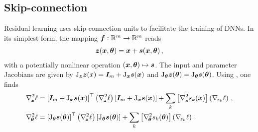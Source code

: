 \subsection{Skip-connection}\label{hbp::subsec:skipconnectionBackwardPass}
Residual learning \cite{he2016deep} uses skip-connection units to
facilitate the training of DNNs. In its simplest form, the
mapping ${\bm{f}}: \mathbb{R}^m \to \mathbb{R}^m$ reads
\begin{align*}
  {\bm{z}}({\bm{x}},{\bm{\theta}}) = {\bm{x}} + {\bm{s}}({\bm{x}}, {\bm{\theta}})\,,
\end{align*}
with a potentially nonlinear operation $({\bm{x}},{\bm{\theta}}) \mapsto {\bm{s}}$. The input
and parameter Jacobians are given by $\mathrm{J}_{{\bm{z}}} {\bm{z}}(x) = {\bm{I}}_m +
\mathrm{J}_{{\bm{x}}}{\bm{s}}({\bm{x}})$ and $\mathrm{J}_{{\bm{\theta}}}{\bm{z}}({\bm{\theta}}) = \mathrm{J}_{{\bm{\theta}}}
{\bm{s}}({\bm{\theta}})$. Using , one finds
\begin{align*}
  \gradsquared{\vx}\ell
  &=
    \left[ \mI_m + \jac_{\vx} \vs(\vx)\right]^\top
    \left(\gradsquared{\vz}\ell\right)
    \left[ \mI_m + \jac_{\vx} \vs(\vx) \right]
    +
    \sum_k \left[ \gradsquared{\vx} s_k(\vx)\right] \left(\grad{z_k}\ell\right)\,,
  \\
  \gradsquared{\vtheta}\ell
  &=
    \left[\jac_{\vtheta} \vs(\vtheta)\right]^\top
    \left(\gradsquared{\vz}\ell\right)
    \left[\jac_{\vtheta} \vs(\vtheta) \right]
    +
    \sum_k \left[\gradsquared{\vtheta} s_k(\vtheta)\right] \left(\grad{z_k}\ell\right)\,.
\end{align*}


